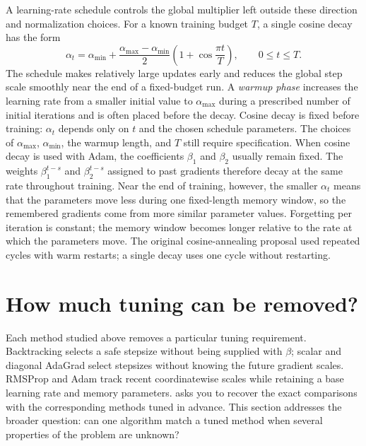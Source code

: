 \documentclass[11pt,twoside]{article}
\theoremstyle{definition}
\theoremstyle{remark}
\begin{document}
A learning-rate schedule controls the global multiplier left outside these
direction and normalization choices. For a known training budget $T$, a
single cosine decay has the form
\begin{equation}
 \alpha_t
 =\alpha_{\min}
  +\frac{\alpha_{\max}-\alpha_{\min}}2
   \left(1+\cos\frac{\pi t}{T}\right),
 \qquad 0\le t\le T.
 \label{eq:cosine-learning-rate}
\end{equation}
The schedule makes relatively large updates early and reduces the global
step scale smoothly near the end of a fixed-budget run. A \emph{warmup phase}
increases the learning rate from a smaller initial value to
$\alpha_{\max}$ during a prescribed number of initial iterations and is often
placed before the decay. Cosine decay is fixed before training:
$\alpha_t$ depends only on $t$ and the chosen schedule parameters. The choices
of $\alpha_{\max}$,
$\alpha_{\min}$, the warmup length, and $T$ still require specification.
When cosine decay is used with Adam, the coefficients $\beta_1$ and $\beta_2$
usually remain fixed. The weights $\beta_1^{t-s}$ and $\beta_2^{t-s}$ assigned
to past gradients therefore decay at the same rate throughout training. Near
the end of training, however, the smaller $\alpha_t$ means that the parameters
move less during one fixed-length memory window, so the remembered gradients
come from more similar parameter values. Forgetting per iteration is constant;
the memory window becomes longer relative to the rate at which the parameters
move.
The original cosine-annealing proposal used repeated cycles with warm
restarts; a single decay uses one cycle without restarting.

\section{How much tuning can be removed?}
\label{sec:tuning-free}

Each method studied above removes a particular tuning requirement.
Backtracking selects a safe stepsize without being supplied with $\beta$;
scalar and diagonal AdaGrad select stepsizes without knowing the future
gradient scales. RMSProp and Adam track recent coordinatewise scales while
retaining a base learning rate and memory parameters.
 asks you to recover the exact comparisons with
the corresponding methods tuned in advance. This section addresses the
broader question: can one algorithm match a tuned method when several
properties of the problem are unknown?
\end{document}
